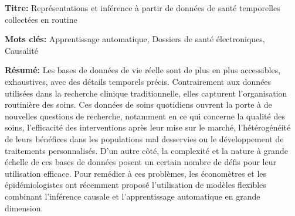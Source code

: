 \documentclass[french,12pt,twoside,a4paper]{book}
\begin{document}
\begin{mdframed}[linecolor=Prune,linewidth=1]

  \textbf{Titre:} Représentations et inférence à partir de données de santé temporelles collectées en routine


  \noindent \textbf{Mots clés:} Apprentissage automatique, Dossiers de santé
  électroniques, Causalité

  \vspace{-.5cm}
  \begin{multicols}{2}
    \noindent \textbf{Résumé:} Les bases de données de vie réelle sont de plus
    en plus accessibles, exhaustives, avec des détails temporels précis.
    Contrairement aux données utilisées dans la recherche clinique
    traditionnelle, elles capturent l'organisation routinière des soins. Ces
    données de soins quotidiens ouvrent la porte à de nouvelles questions de
    recherche, notamment en ce qui concerne la qualité des soins, l'efficacité
    des interventions après leur mise sur le marché, l'hétérogénéité de leurs
    bénéfices dans les populations mal desservies ou le développement de
    traitements personnalisés. D'un autre côté, la complexité et la nature à
    grande échelle de ces bases de données posent un certain nombre de défis
    pour leur utilisation efficace. Pour remédier à ces problèmes, les
    économètres et les épidémiologistes ont récemment proposé l'utilisation de
    modèles flexibles combinant l'inférence causale et l'apprentissage
    automatique en grande dimension.


\end{multicols}
\end{mdframed}
\end{document}
